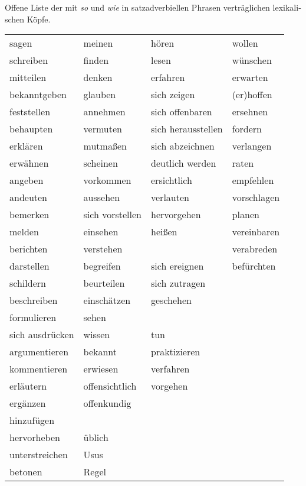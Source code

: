 \documentclass[output=paper, colorlinks, citecolor=brown, booklanguage=german]{langscibook}
\begin{document}
\begin{otherlanguage}{german}
Offene Liste der mit \textit{so} und \textit{wie} in satzadverbiellen Phrasen verträglichen lexikalischen Köpfe.

\begin{longtable}{llll}
    sagen & meinen & hören & wollen \\
    schreiben & finden & lesen & wünschen \\
    mitteilen & denken & erfahren & erwarten \\
    bekanntgeben & glauben & sich zeigen & (er)hoffen \\
    feststellen & annehmen & sich offenbaren & ersehnen \\
    behaupten & vermuten & sich herausstellen & fordern \\
    erklären & mutmaßen & sich abzeichnen & verlangen \\
    erwähnen & scheinen & deutlich werden & raten \\
    angeben & vorkommen & ersichtlich & empfehlen \\
    andeuten & aussehen & verlauten & vorschlagen \\
    bemerken & sich vorstellen & hervorgehen & planen \\
    melden & einsehen & heißen & vereinbaren \\
    berichten & verstehen & {} & verabreden \\
    darstellen & begreifen & sich ereignen & befürchten \\
    schildern & beurteilen & sich zutragen & {} \\
    beschreiben & einschätzen & geschehen & {} \\
    formulieren & sehen & {} & {} \\
    sich ausdrücken & wissen & tun & {} \\
    argumentieren & bekannt & praktizieren & {} \\
    kommentieren & erwiesen & verfahren & {} \\
    erläutern & offensichtlich & vorgehen & {} \\
    ergänzen & offenkundig & {} & {} \\
    hinzufügen & {} & {} & {} \\
    hervorheben & üblich & {} & {} \\
    unterstreichen & Usus & {} & {} \\
    betonen & Regel & {} & {} \\

\end{longtable}
\end{otherlanguage}
\end{document}
